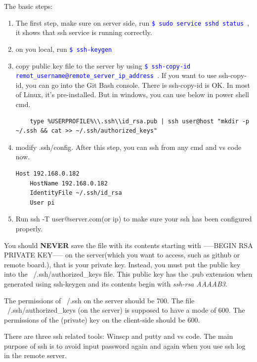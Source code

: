 \documentclass[paper=8.5in:11in, twoside, 12pt, pagesize=pdftex]{book}
\newcommand{\linuxcommand}[1]{\texttt{\textcolor{blue}{\$ #1 \Pisymbol{psy}{191}}}}
\begin{document}
	The basic steps:
\begin{enumerate}
	\item The first step, make sure on server side, run \linuxcommand{sudo service sshd status}, it shows that ssh service is running correctly.
	
	\item on you local, run \linuxcommand{ssh-keygen}
	
	\item copy public key file to the server by using \linuxcommand{ssh-copy-id remot\_username@remote\_server\_ip\_address}. If you want to use ssh-copy-id, you can go into the Git Bash console. There is ssh-copy-id is OK. In most of Linux, it's pre-installed. But in windows, you can use below in power shell cmd.
	
\begin{verbatim}
	type %USERPROFILE%\\.ssh\\id_rsa.pub | ssh user@host "mkdir -p ~/.ssh && cat >> ~/.ssh/authorized_keys" 
\end{verbatim}

	\item modify .ssh/config. After this step, you can ssh from any cmd and vs code now.
\begin{verbatim}
Host 192.168.0.182
	HostName 192.168.0.182
	IdentityFile ~/.ssh/id_rsa
	User pi
\end{verbatim}

	\item Run ssh -T user@server.com(or ip) to make sure your ssh has been configured properly.
\end{enumerate} 
	 
	You should \textbf{NEVER} save the file with its contents starting with -----BEGIN RSA PRIVATE KEY----- on the server(which you want to access, such as github or remote board.), that is your private key. Instead, you must put the public key into the ~/.ssh/authorized\_keys file. This public key has the .pub extension when generated using ssh-keygen and its contents begin with \textit{ssh-rsa AAAAB3}.
	
	The permissions of ~/.ssh on the server should be 700. The file ~/.ssh/authorized\_keys (on the server) is supposed to have a mode of 600. The permissions of the (private) key on the client-side should be 600.
	
	There are three ssh related tools: Winscp and putty and vs code. The main purpose of ssh is to avoid input password again and again when you use ssh log in the remote server. 
	
\end{document}
